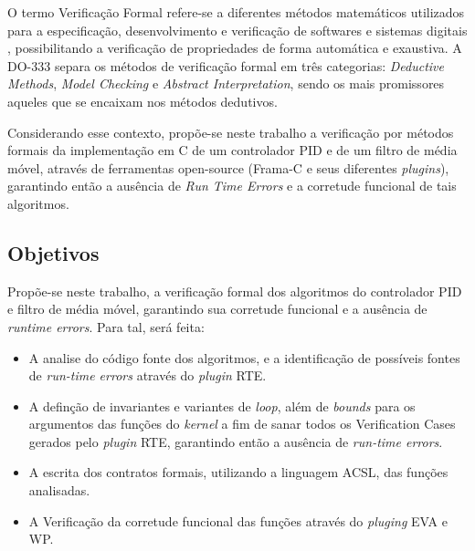 \documentclass{article}
\begin{document}
    O termo Verificação Formal refere-se a diferentes métodos matemáticos utilizados para  a especificação, desenvolvimento e verificação de softwares e sistemas digitais \cite{rtca333}, possibilitando a verificação de propriedades de forma automática e exaustiva. A DO-333 separa os métodos de verificação formal em três categorias: \emph{Deductive Methods}, \emph{Model Checking} e \emph{Abstract Interpretation}, sendo os mais promissores aqueles que se encaixam nos métodos dedutivos. 

    Considerando esse contexto, propõe-se neste trabalho a verificação por métodos formais da implementação em C de um controlador PID e de um filtro de média móvel, através de ferramentas open-source (Frama-C e seus diferentes \emph{plugins}), garantindo então a ausência de \emph{Run Time Errors} e a corretude funcional de tais algoritmos.


    \subsection{Objetivos}
    Propõe-se neste trabalho, a verificação formal dos algoritmos do controlador PID e filtro de média móvel, garantindo sua  corretude funcional e a ausência de \emph{runtime errors}. Para tal, será feita:
    \begin{itemize}
        \item A analise do código fonte dos algoritmos, e a identificação de possíveis fontes de \emph{run-time errors} através do \emph{plugin} RTE.
        \item A definção de invariantes e variantes de \emph{loop}, além de \emph{bounds} para os argumentos das funções do \emph{kernel} a fim de sanar todos os Verification Cases gerados pelo \emph{plugin} RTE, garantindo então a ausência de \emph{run-time errors}.
        \item A escrita dos contratos formais, utilizando a linguagem ACSL, das funções analisadas.
        \item A Verificação da corretude funcional das funções através do \emph{pluging} EVA e WP.
    \end{itemize}
\end{document}

